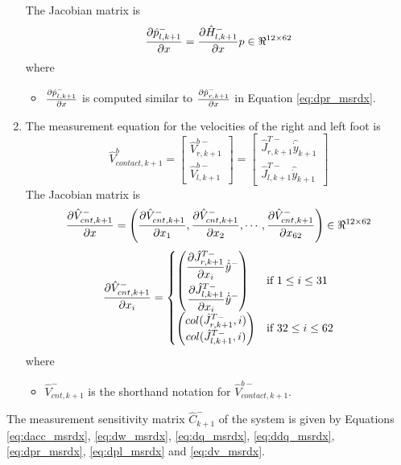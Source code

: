 \begin{enumerate}
 The Jacobian matrix is 
\begin{equation}
    \label{eq:dpl_msrdx}
    \frac{\partial {\hat{p}_{l,k+1}^-}}{\partial {x}} = \frac{\partial {\hat{H}_{l,k+1}^-}}{\partial {x}}p\in \Re^{12 \times 62}
\end{equation}where
\begin{itemize}
    \item $\frac{\partial {\hat{p}_{l,k+1}^-}}{\partial {x}}$ is computed similar to $\frac{\partial {\hat{p}_{r,k+1}^-}}{\partial {x}}$ in Equation \ref{eq:dpr_msrdx}.
\end{itemize}

\item The measurement equation for the velocities of the right and left foot is  $$\hat{V}_{contact,k+1}^b = \begin{bmatrix} \hat{V}_{r,k+1}^{b-} \\ \hat{V}_{l,k+1}^{b-} \end{bmatrix} 
=\begin{bmatrix}\hat{J}_{r,k+1}^{T-} \hat{\dot{y}}_{k+1}\\ \hat{J}_{l,k+1}^{T-} \hat{\dot{y}}_{k+1}\end{bmatrix}$$
The Jacobian matrix is 
\begin{equation}
    \label{eq:dv_msrdx}
     \frac{\partial {\hat{V}_{cnt,k+1}^-}}{\partial {x}} = \left( \frac{\partial {\hat{V}_{cnt,k+1}^-}}{\partial {x_1}}, \frac{\partial {\hat{V}_{cnt,k+1}^-}}{\partial {x_2}},\cdots, \frac{\partial {\hat{V}_{cnt,k+1}^-}}{\partial {x_{62}}} \right)\in \Re^{12 \times 62}
\end{equation}
\[
\frac{\partial {\hat{V}_{cnt,k+1}^{-}}}{\partial {x_{i}}} = 
	\begin{cases}
	\left(
	\begin{aligned}
	\frac{\partial {\hat{J}_{r,k+1}^{T-}}}{\partial {x_{i}}}\dot{\hat{y}}^- \\
	\frac{\partial {\hat{J}_{l,k+1}^{T-}}}{\partial {x_{i}}}\dot{\hat{y}}^- \\
	\end{aligned} \right)
	& \text{if } 1 \leq i \leq 31 \\
	\begin{pmatrix}
	col(\hat{J}_{r,k+1}^{T-},i)\\ col(\hat{J}_{l,k+1}^{T-},i)
	\end{pmatrix}
	 	& \text{if } 32 \leq i \leq 62
	\end{cases}
\]where
\begin{itemize}
    \item $ \hat{V}_{cnt,k+1}^{-}$ is the shorthand notation for $\hat{V}_{contact,k+1}^{b-} $.
\end{itemize}
\end{enumerate}
The measurement sensitivity matrix $\hat{C}_{k+1}^-$ of the system is given by Equations \ref{eq:dacc_msrdx}, \ref{eq:dw_msrdx}, \ref{eq:dq_msrdx}, \ref{eq:ddq_msrdx}, \ref{eq:dpr_msrdx}, \ref{eq:dpl_msrdx} and \ref{eq:dv_msrdx}.
